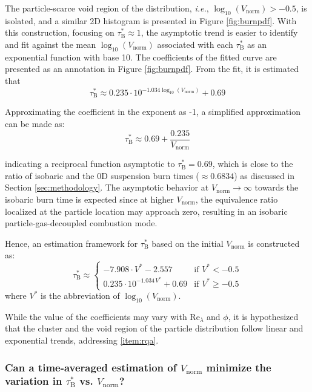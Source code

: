 \documentclass[times,twocolumn,final]{elsarticle}
\newcommand{\mrm}[1]{\mathrm{#1}}
\newcommand{\Rel}{\mathrm{Re}_\lambda}
\newcommand{\taub}{\tau_\mathrm{B}}
\begin{document}
The particle-scarce void region of the distribution, \emph{i.e.}, $\log_{10}\left(V_\mrm{norm}\right) > -0.5$, is isolated, and a similar 2D histogram is presented in Figure \ref{fig:burnpdf}. With this construction, focusing on $\taub^* \approx 1$, the asymptotic trend is easier to identify and fit against the mean $\log_{10}\left(V_\mrm{norm}\right)$ associated with each $\taub^*$ as an exponential function with base 10. The coefficients of the fitted curve are presented as an annotation in Figure \ref{fig:burnpdf}. From the fit, it is estimated that
\begin{equation}
    \taub^* \approx 0.235 \cdot 10^{-1.034 \log_{10}(V_\mrm{norm})} + 0.69 \label{eq:burnpdf}
\end{equation}

Approximating the coefficient in the exponent as -1, a simplified approximation can be made as:
\begin{equation}
    \taub^* \approx 0.69 + \frac{0.235}{V_\mrm{norm}} \label{eq:burnpdf2}
\end{equation}

\noindent indicating a reciprocal function asymptotic to $\taub^* = 0.69$, which is close to the ratio of isobaric and the 0D suspension burn times ($\approx 0.6834$) as discussed in Section \ref{sec:methodology}. The asymptotic behavior at $V_\mrm{norm} \to \infty$ towards the isobaric burn time is expected since at higher $V_\mrm{norm}$, the equivalence ratio localized at the particle location may approach zero, resulting in an isobaric particle-gas-decoupled combustion mode.

Hence, an estimation framework for $\taub^*$ based on the initial $V_\mrm{norm}$ is constructed as:
\begin{equation}
\taub^* \approx 
\begin{cases}
  -7.908 \cdot V^* - 2.557       & \text{if } V^* < -0.5 \\
  0.235 \cdot 10^{-1.034\, V^*} + 0.69      & \text{if } V^* \geq -0.5
\end{cases} \label{eq:caseconstruct}
\end{equation}
where $V^*$ is the abbreviation of $\log_{10}(V_\mrm{norm})$.

While the value of the coefficients may vary with $\Rel$ and $\phi$, it is hypothesized that the cluster and the void region of the particle distribution follow linear and exponential trends, addressing \ref{item:rqa}.

\subsubsection{Can a time-averaged estimation of $V_\mrm{norm}$ minimize the variation in $\taub^*$ vs. $V_\mrm{norm}$?}
\end{document}
